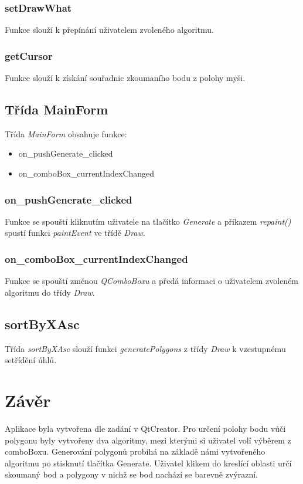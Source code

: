 \documentclass{article}
\begin{document}
\subsubsection{setDrawWhat}
Funkce slouží k přepínání uživatelem zvoleného algoritmu.

\subsubsection{getCursor}
Funkce slouží k získání souřadnic zkoumaního bodu z polohy myši.

\subsection{Třída MainForm}
Třída \emph{MainForm} obsahuje funkce:
\begin{itemize}
\item on\_pushGenerate\_clicked
\item on\_comboBox\_currentIndexChanged
\end{itemize}

\subsubsection{on\_pushGenerate\_clicked}
Funkce se spouští kliknutím uživatele na tlačítko \emph{Generate} a příkazem \emph{repaint()} spustí funkci \emph{paintEvent} ve třídě \emph{Draw}.

\subsubsection{on\_comboBox\_currentIndexChanged}
Funkce se spouští změnou \emph{QComboBoxu} a předá informaci o uživatelem zvoleném algoritmu do třídy \emph{Draw}.

\subsection{sortByXAsc}
Třída \emph{sortByXAsc} slouží funkci \emph{generatePolygons} z třídy \emph{Draw} k vzestupnému setřídění úhlů.
\newpage
\section{Závěr}
Aplikace byla vytvořena dle zadání v QtCreator. Pro určení polohy bodu vůči polygonu byly vytvořeny dva algoritmy, mezi kterými si uživatel volí výběrem z comboBoxu. Generování polygonů probíhá na základě námi vytvořeného algoritmu po stisknutí tlačítka Generate. Uživatel klikem do kreslící oblasti určí skoumaný bod a polygony v nichž se bod nachází se barevně zvýrazní.
\end{document}
